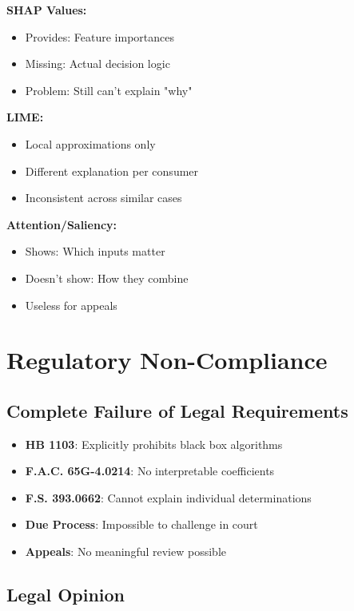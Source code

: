 \textbf{SHAP Values:}
\begin{itemize}
    \item Provides: Feature importances
    \item Missing: Actual decision logic
    \item Problem: Still can't explain "why"
\end{itemize}
\textbf{LIME:}
\begin{itemize}
    \item Local approximations only
    \item Different explanation per consumer
    \item Inconsistent across similar cases
\end{itemize}
\textbf{Attention/Saliency:}
\begin{itemize}
    \item Shows: Which inputs matter
    \item Doesn't show: How they combine
    \item Useless for appeals
\end{itemize}

\section{Regulatory Non-Compliance}

\subsection{Complete Failure of Legal Requirements}

\begin{itemize}
    \item[\redcross] \textbf{HB 1103}: Explicitly prohibits black box algorithms
    \item[\redcross] \textbf{F.A.C. 65G-4.0214}: No interpretable coefficients
    \item[\redcross] \textbf{F.S. 393.0662}: Cannot explain individual determinations
    \item[\redcross] \textbf{Due Process}: Impossible to challenge in court
    \item[\redcross] \textbf{Appeals}: No meaningful review possible
\end{itemize}

\subsection{Legal Opinion}

